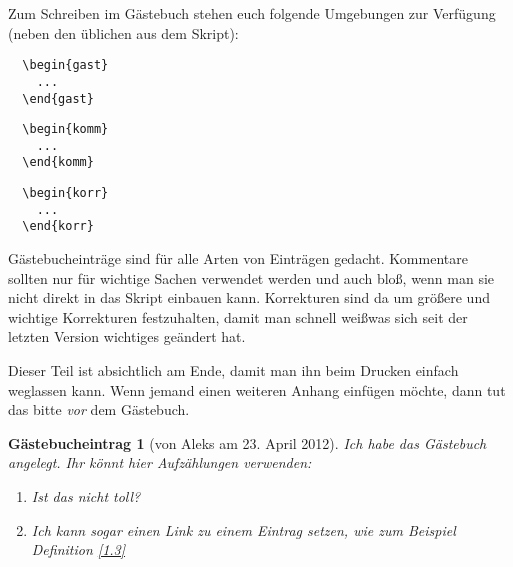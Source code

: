 \documentclass[a4paper, 12pt, numbers=noendperiod, chapterprefix=true]{scrbook}
\theoremstyle{break}
\theoremstyle{nonumberbreak}
\newtheorem{gast}{G\"astebucheintrag}
\newtheorem{komm}{Kommentar}
\newtheorem{korr}{Korrktur}
\theoremstyle{nonumberplain}
\begin{document}
Zum Schreiben im G\"astebuch stehen euch folgende Umgebungen zur Verf\"ugung (neben den \"ublichen aus dem Skript):
\begin{center}\begin{minipage}{0.3\textwidth}\begin{verbatim}
  \begin{gast}
    ...
  \end{gast}
\end{verbatim}\end{minipage}
\begin{minipage}{0.3\textwidth}\begin{verbatim}  
  \begin{komm}
    ...  
  \end{komm}
\end{verbatim}\end{minipage}
\begin{minipage}{0.3\textwidth}\begin{verbatim}  
  \begin{korr}
    ...  
  \end{korr}
\end{verbatim}\end{minipage}\end{center}
G\"astebucheintr\"age sind f\"ur alle Arten von Eintr\"agen gedacht. Kommentare sollten nur f\"ur wichtige Sachen verwendet werden und auch blo\ss,  wenn man sie nicht direkt in das Skript einbauen kann. Korrekturen sind da um gr\"o\ss ere und wichtige Korrekturen festzuhalten, damit man schnell wei\ss was sich seit der letzten Version wichtiges ge\"andert hat.

Dieser Teil ist absichtlich am Ende, damit man ihn beim Drucken einfach weglassen kann. Wenn jemand einen weiteren Anhang einf\"ugen m\"ochte, dann tut das bitte \emph{vor} dem G\"astebuch.\\

\begin{gast}[von Aleks am 23. April 2012]
Ich habe das G\"astebuch angelegt. Ihr k\"onnt hier Aufz\"ahlungen verwenden:
\begin{enumerate}[1)]
\item
  Ist das nicht toll?
\item
  Ich kann sogar einen Link zu einem Eintrag setzen, wie zum Beispiel Definition \ref{1.3}
\end{enumerate}
\end{gast}
\end{document}
